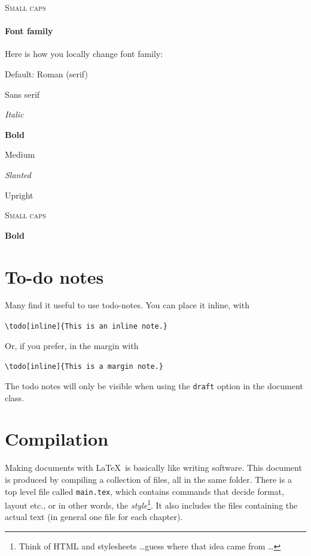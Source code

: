     \textsc{Small caps}
    
\paragraph{Font family}
Here is how you locally change font family:
 \begin{compactitem}
  \item \textrm{Default: Roman (serif)}
  \item \textsf{Sans serif}
  \item \textit{Italic}
  \item \textbf{Bold}
  \item \textmd{Medium}
  \item \textsl{Slanted}
  \item \textup{Upright}
  \item \textsc{Small caps}
  \item \textbf{Bold}
 \end{compactitem}   
    
    
\section{To-do notes}
\label{sec:miscellaneous}

Many find it useful to use todo-notes. You can place it inline, with

\verb|\todo[inline]{This is an inline note.}|

Or, if you prefer, in the margin with 

\verb|\todo[inline]{This is a margin note.}|

 The todo notes will only be visible when using the \texttt{draft} option in the document class.

\section{Compilation}


Making documents with \LaTeX\ is basically like writing software. 
This document is produced by compiling a collection of files, all in the same folder.
There is a top level file called 
\texttt{main.tex}, which contains commands that decide format, layout etc., or in other words, the {\em style}\footnote{Think of HTML and stylesheets \dots guess where that idea came from \dots}. It also includes the files containing the actual text (in general one file for each chapter).

